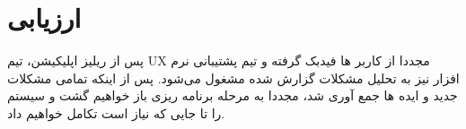 \newpage
\section{ارزیابی}

پس از ریلیز اپلیکیشن، تیم UX مجددا از کاربر ها فیدبک گرفته و تیم پشتیبانی نرم افزار نیز به تحلیل مشکلات گزارش شده مشغول می‌شود.
پس از اینکه تمامی مشکلات جدید و ایده ها جمع آوری شد، مجددا به مرحله برنامه ریزی باز خواهیم گشت و سیستم را تا جایی که نیاز است تکامل خواهیم داد.
